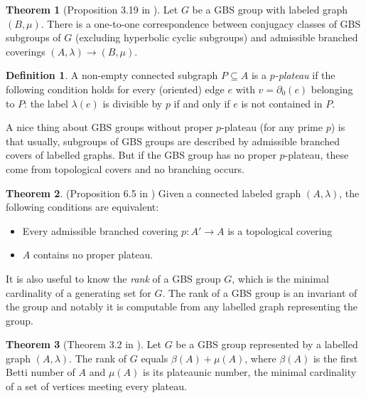 \documentclass[10pt]{article}
\def\subs{\subseteq}
\theoremstyle{definition}
\newtheorem{theorem}{Theorem}
\newtheorem{definition}{Definition}
\begin{document}
\begin{theorem}[Proposition 3.19 in \cite{For24}] Let $G$ be a GBS group with labeled graph $(B,\mu)$. There is a one-to-one
correspondence between conjugacy classes of GBS subgroups of $G$ (excluding hyperbolic
cyclic subgroups) and admissible branched coverings $(A,\lambda) \to (B,\mu)$.
\end{theorem}

\begin{definition}
   A non-empty connected subgraph $P \subs A$ is a \textit{$p$-plateau} if the following condition holds for every (oriented) edge $e$ with $v=\partial_0(e)$ belonging to $P$: the label $\lambda(e)$ is divisible by $p$ if and only if $e$ is not contained in $P$. 
\end{definition}

A  nice thing about GBS groups without proper $p$-plateau (for any prime $p$) is that usually, subgroups of GBS groups are described by admissible branched covers of  labelled graphs. But if the GBS group has no proper $p$-plateau, these  come from topological covers and no branching occurs. 

\begin{theorem}\label{Lev15}(Proposition 6.5 in \cite{Lev})
Given a connected labeled graph $(A, \lambda)$, the following conditions are
equivalent:
\begin{itemize}
    \item Every admissible branched covering $p:A' \to A$ is a topological covering
    \item $A$ contains no proper plateau.
\end{itemize}
\end{theorem}

It is also useful to know the \textit{rank} of a GBS group $G$, which is the minimal cardinality of a generating set for $G$. The rank of a GBS group is an invariant of the group and notably it is computable from any labelled graph representing the group. 

\begin{theorem}[Theorem 3.2 in \cite{Lev}]
Let $G$ be a GBS group represented by a labelled graph $(A,\lambda)$. 
The rank of $G$ equals $\beta(A) + \mu(A)$, where $\beta(A)$ is the first Betti number of $A$ and $\mu(A)$ is its plateaunic number, the minimal cardinality of a set of vertices meeting
every plateau. 
\end{theorem}
\end{document}
